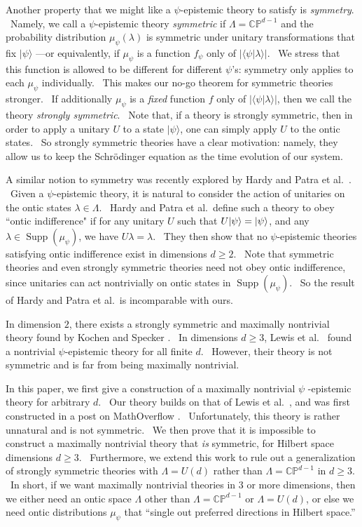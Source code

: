 \documentclass[letterpaper,12pt]{article}
\newcommand{\ket}[1]{\mbox{$ | #1 \rangle $}}
\DeclareMathOperator{\supp}{Supp}
\begin{document}
Another property that we might like a $\psi$-epistemic theory to satisfy is
\textit{symmetry}. \ Namely, we call a $\psi$-epistemic theory \textit{%
symmetric} if $\Lambda=\mathbb{CP}^{d-1}$ and the probability distribution $\mu_\psi(\lambda)$ is
symmetric under unitary transformations that fix $ | \psi \rangle $%
---or equivalently, if $\mu_{\psi}$ is a function $f_{\psi}$ only of $| \langle
\psi | \lambda \rangle |$. \ We stress that this function is allowed to be different for different $\psi$'s: symmetry
only applies to each $\mu_{\psi}$ individually. \ This makes our no-go theorem for symmetric theories stronger. \ If
additionally $\mu_{\psi}$ is a \emph{fixed} function $f$ only of $| \langle
\psi | \lambda \rangle |$, then we call the theory \emph{strongly symmetric}. \ Note that, if a theory is strongly symmetric, then in order to apply a unitary $U$ to a state $|\psi \rangle$, one can simply apply $U$ to the ontic states. \ So strongly symmetric theories have a clear motivation: namely, they allow us to keep the Schr\"{o}dinger equation as the time evolution of our system.

A similar notion to symmetry was recently explored by Hardy \cite{hardy} and Patra et al.\ \cite{patra}. \ Given a $\psi$-epistemic theory, it is natural to consider the action of unitaries on the ontic states $\lambda \in \Lambda$. \ Hardy and Patra et al.\ define such a theory to obey ``ontic indifference" if for any unitary $U$ such that $U\ket{\psi}=\ket{\psi}$, and any $\lambda \in \supp(\mu_\psi)$, we have $U\lambda=\lambda$. \ They then show that no $\psi$-epistemic theories satisfying ontic indifference exist in dimensions $d\geq 2$. \ Note that symmetric theories and even strongly symmetric theories need not obey ontic indifference, since unitaries can act nontrivially on ontic states in $\supp(\mu_\psi)$. \ So the result of Hardy and Patra et al.\ is incomparable with ours.

In dimension $2$, there exists a
strongly symmetric and maximally nontrivial theory found by Kochen and Specker \cite%
{ks}. \ In dimensions $d\geq 3$, Lewis et al.\ \cite{lewis} found a
nontrivial $\psi$-epistemic theory for all finite $d$. \ However, their
theory is not symmetric and is far from being maximally nontrivial.

In this paper, we first give a construction of a maximally nontrivial $\psi$%
-epistemic theory for arbitrary $d$. \ Our theory builds on that of
Lewis et al.\ \cite{lewis}, and was first constructed in a post on
MathOverflow \cite{mathoverflow}. \ Unfortunately, this theory is rather unnatural and is
not symmetric. \ We then prove that it is impossible to construct a
maximally nontrivial theory that \emph{is} symmetric, for Hilbert space
dimensions $d\geq 3$. \ Furthermore, we extend this work to rule out a generalization of strongly symmetric theories with $\Lambda=U(d)$ rather than $\Lambda = \mathbb{CP}^{d-1}$ in $d\geq 3$. \ In short, if we want maximally nontrivial
theories in $3$ or more dimensions, then we either need an
ontic space $\Lambda$ other than $\Lambda = \mathbb{CP}^{d-1}$ or $\Lambda=U(d)$, or else we need ontic distributions $\mu_{\psi}$ that
``single out preferred directions in Hilbert space.''
\end{document}
